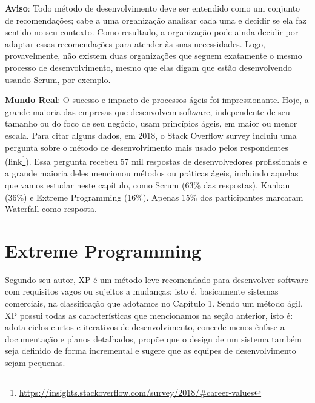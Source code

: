 \documentclass[
  11pt,
  twoside]{book}
\DeclareRobustCommand{\href}[2]{#2\footnote{\url{#1}}}
\newenvironment{esmbox}{\centering \vspace{1.5ex} \begin{tcolorbox}[breakable, colback=backcolor, width=4.9in]}{\end{tcolorbox} \vspace{1.5ex}}
\newenvironment{aviso}{\centering \vspace{1.5ex} \begin{tcolorbox}[breakable, colback=backcolor, width=4.9in]}{\end{tcolorbox} \vspace{1.5ex}}
\begin{document}
\begin{aviso} 

\textbf{Aviso}: Todo método de desenvolvimento deve ser entendido como
um conjunto de recomendações; cabe a uma organização analisar cada uma e
decidir se ela faz sentido no seu contexto. Como resultado, a
organização pode ainda decidir por adaptar essas recomendações para
atender às suas necessidades. Logo, provavelmente, não existem duas
organizações que seguem exatamente o mesmo processo de desenvolvimento,
mesmo que elas digam que estão desenvolvendo usando Scrum, por exemplo.

\end{aviso} 


\begin{esmbox} 

\textbf{Mundo Real}: O sucesso e impacto de processos ágeis foi
impressionante. Hoje, a grande maioria das empresas que desenvolvem
software, independente de seu tamanho ou do foco de seu negócio, usam
princípios ágeis, em maior ou menor escala. Para citar alguns dados, em
2018, o Stack Overflow survey incluiu uma pergunta sobre o método de
desenvolvimento mais usado pelos respondentes
(\href{https://insights.stackoverflow.com/survey/2018/\#career-values}{link}).
Essa pergunta recebeu 57 mil respostas de desenvolvedores profissionais
e a grande maioria deles mencionou métodos ou práticas ágeis, incluindo
aquelas que vamos estudar neste capítulo, como Scrum (63\% das
respostas), Kanban (36\%) e Extreme Programming (16\%). Apenas 15\% dos
participantes marcaram Waterfall como resposta.

\end{esmbox}

\hypertarget{extreme-programming}{%
\section{Extreme Programming}\label{extreme-programming}}

 Segundo seu autor, XP é um método leve
recomendado para desenvolver software com requisitos vagos ou sujeitos a
mudanças; isto é, basicamente sistemas comerciais, na classificação que
adotamos no Capítulo 1. Sendo um método ágil, XP possui todas as
características que mencionamos na seção anterior, isto é: adota ciclos
curtos e iterativos de desenvolvimento, concede menos ênfase a
documentação e planos detalhados, propõe que o design de um sistema
também seja definido de forma incremental e sugere que as equipes de
desenvolvimento sejam pequenas.
\end{document}
